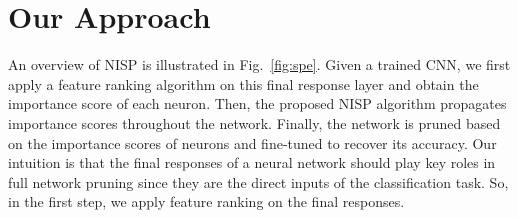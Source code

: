 \documentclass[10pt,twocolumn,letterpaper]{article}
\begin{document}
\section{Our Approach}%
An overview of NISP is illustrated in Fig.~\ref{fig:spe}. Given a trained CNN, we first apply a feature ranking algorithm on this final response layer and obtain the importance score of each neuron. Then, the proposed NISP algorithm propagates importance scores throughout the network. 
Finally, the network is pruned based on the importance scores of neurons and fine-tuned to recover its accuracy.
Our intuition is that the final responses of a neural network should play key roles in full network pruning since they are the direct inputs of the classification task. So, in the first step, we apply feature ranking on the final responses.
\end{document}
